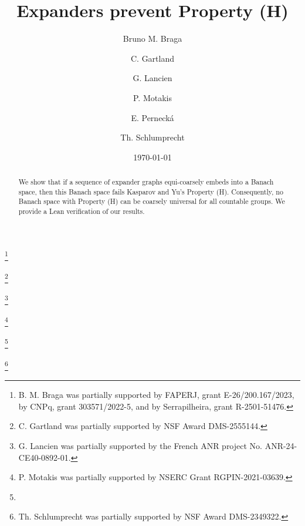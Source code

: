 \documentclass[11pt]{amsart}
\theoremstyle{definition}
\theoremstyle{remark}
\begin{document}
\date{\today} %

\title[Expanders prevent Property (H)]{Expanders prevent Property (H)}
 
  
\author[Braga]{Bruno M. Braga}
\address[B. M. Braga]{IMPA, Estrada Dona Castorina 110, 22460-320, Rio de Janeiro, Brazil}
\thanks {B. M. Braga  was partially supported by FAPERJ, grant E-26/200.167/2023,  by CNPq, grant 303571/2022-5, and by Serrapilheira, grant R-2501-51476.}

\author[Gartland]{C. Gartland}
\address[C. Gartland]{Department of Mathematics and Statistics, University of
North Carolina at Charlotte, Charlotte, North Carolina, USA}
\thanks{C. Gartland was partially supported by NSF Award DMS-2555144.}

\author[Lancien]{G. Lancien}
\address[G. Lancien]{Universit\'e Marie et Louis Pasteur, CNRS, LmB (UMR 6623), F-25000 Besan\c con, France.}
\thanks{G. Lancien was partially supported by the French ANR project No. ANR-24-CE40-0892-01.}

\author[Motakis]{P. Motakis}
\address[P. Motakis]{Department of Mathematics and Statistics, York University, 4700 Keele Street, Toronto, Ontario, M3J 1P3, Canada}
\thanks{P. Motakis was partially supported by NSERC Grant RGPIN-2021-03639.}

\author[Perneck\'a]{E. Perneck\'a}
\address[E. Perneck\'a]{Faculty of Information Technology, Czech Technical University in Prague, Th\'akurova 9, 160 00, Prague 6, Czech Republic}
\thanks{}

\author[Schlumprecht]{Th. Schlumprecht}
\address[Th. Schlumprecht]{Texas A\&M University, College Station, TX 77843,
USA and Faculty of Electrical Engineering, Czech Technical University in Prague, Zikova 4, 166 27, Prague}
\thanks{Th. Schlumprecht was partially supported by NSF Award DMS-2349322.}
\begin{abstract}
    We show that if a sequence of expander graphs equi-coarsely embeds into a Banach space, then this Banach space  fails Kasparov and Yu's Property (H).  Consequently,  no Banach space with Property (H) can be coarsely universal for all countable groups. We provide a Lean verification of our results.
\end{abstract}
\end{document}
